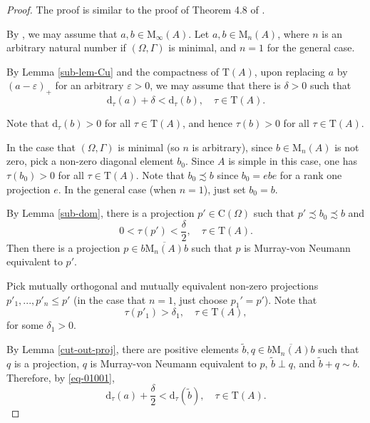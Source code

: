 \documentclass[12pt, oneside, psamsfonts]{amsart}
\theoremstyle{definition}
\theoremstyle{remark}
\numberwithin{equation}{section}
\newcommand{\eps}{\varepsilon}
\newcommand{\tr}{\mathrm{T}}
\begin{document}
\begin{proof}
The proof is similar to the proof of Theorem 4.8 of \cite{Niu-MD-Z}.

By \cite{RC-5-person}, we may assume that $a, b \in \mathrm{M}_\infty(A)$. Let $a, b \in \mathrm{M}_n(A)$, where $n$ is an arbitrary natural number if $(\Omega, \Gamma)$ is minimal, and $n=1$ for the general case.

By Lemma \ref{sub-lem-Cu} and the compactness of $\tr(A)$, upon replacing $a$ by $(a-\eps)_+$ for an arbitrary $\eps>0$, we may assume that there is $\delta>0$ such that 
$$ \mathrm{d}_\tau(a) + \delta < \mathrm{d}_\tau(b),\quad \tau \in \tr(A). $$

Note that $\mathrm{d}_\tau(b) >0$ for all $\tau \in \tr(A)$, and hence $\tau(b) > 0$ for all $\tau \in \tr(A)$. 

In the case that $(\Omega, \Gamma)$ is minimal (so $n$ is arbitrary), since $b \in \mathrm{M}_n(A)$ is not zero, pick a non-zero diagonal element $b_0$. Since $A$ is simple in this case, one has $\tau(b_0) > 0$ for all $\tau \in \tr(A)$. Note that $b_0\precsim b$ since $b_0 = ebe$ for a rank one projection $e$. In the general case (when $n=1$), just set $b_0 = b$.

By Lemma \ref{sub-dom}, there is a projection $p' \in \mathrm{C}(\Omega)$ such that $p' \precsim b_0 \precsim b$ and 
\begin{equation}\label{eq-01001}
 0 < \tau(p') < \frac{\delta}{2}, \quad \tau \in \tr(A).
 \end{equation}
Then there is a projection $p \in \overline{b\mathrm{M}_n(A)b}$ such that $p$ is Murray-von Neumann equivalent to $p'$. %

Pick mutually orthogonal and mutually equivalent non-zero projections $p'_1, ..., p'_n \leq p'$ (in the case that $n=1$, just choose $p_1' = p'$). Note that
\begin{equation}\label{eq-0100101}
\tau(p'_1) > \delta_1, \quad \tau \in \tr(A),
\end{equation}
for some $\delta_1>0$.

By Lemma \ref{cut-out-proj}, there are positive elements $\tilde{b}, q \in \overline{b\mathrm{M}_n(A)b}$ such that $q$ is a projection, $q$ is Murray-von Neumann equivalent to $p$, $\tilde{b} \perp q$, and $\tilde{b} + q \sim b$. Therefore, by \eqref{eq-01001}, 
\begin{equation}\label{trace-comp}
\mathrm{d}_\tau(a) + \frac{\delta}{2} < \mathrm{d}_\tau(\tilde{b}), \quad \tau \in \tr(A).
\end{equation} 


\end{proof}
\end{document}
